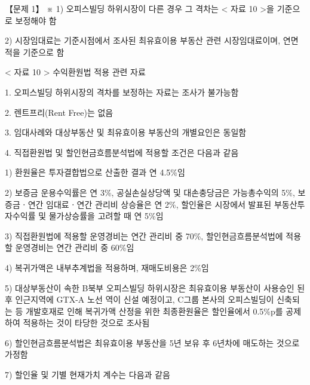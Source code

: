 \begin{longquestion}{【문제 1】}
※ 1) 오피스빌딩 하위시장이 다른 경우 그 격차는 < 자료 10 >을 기준으로 보정해야 함 \par
2) 시장임대료는 기준시점에서 조사된 최유효이용 부동산 관련 시장임대료이며, 연면적을 기준으로 함 \par
< 자료 10 > 수익환원법 적용 관련 자료 \par
1. 오피스빌딩 하위시장의 격차를 보정하는 자료는 조사가 불가능함 \par
2. 렌트프리(Rent Free)는 없음 \par
3. 임대사례와 대상부동산 및 최유효이용 부동산의 개별요인은 동일함 \par
4. 직접환원법 및 할인현금흐름분석법에 적용할 조건은 다음과 같음 \par
1) 환원율은 투자결합법으로 산출한 결과 연 4.5\%임 \par
2) 보증금 운용수익률은 연 3\%, 공실손실상당액 및 대손충당금은 가능총수익의 5\%, 보증금ㆍ연간 임대료ㆍ연간 관리비 상승율은 연 2\%, 할인율은 시장에서 발표된 부동산투자수익률 및 물가상승률을 고려할 때 연 5\%임 \par
3) 직접환원법에 적용할 운영경비는 연간 관리비 중 70\%, 할인현금흐름분석법에 적용할 운영경비는 연간 관리비 중 60\%임 \par
4) 복귀가액은 내부추계법을 적용하며, 재매도비용은 2\%임 \par
5) 대상부동산이 속한 B북부 오피스빌딩 하위시장은 최유효이용 부동산이 사용승인 된 후 인근지역에 GTX-A 노선 역이 신설 예정이고, C그룹 본사의 오피스빌딩이 신축되는 등 개발호재로 인해 복귀가액 산정을 위한 최종환원율은 할인율에서 0.5\%p를 공제하여 적용하는 것이 타당한 것으로 조사됨 \par
6) 할인현금흐름분석법은 최유효이용 부동산을 5년 보유 후 6년차에 매도하는 것으로 가정함 \par
7) 할인율 및 기별 현재가치 계수는 다음과 같음 \par
{\small\centering
{}\par}


\end{longquestion}
